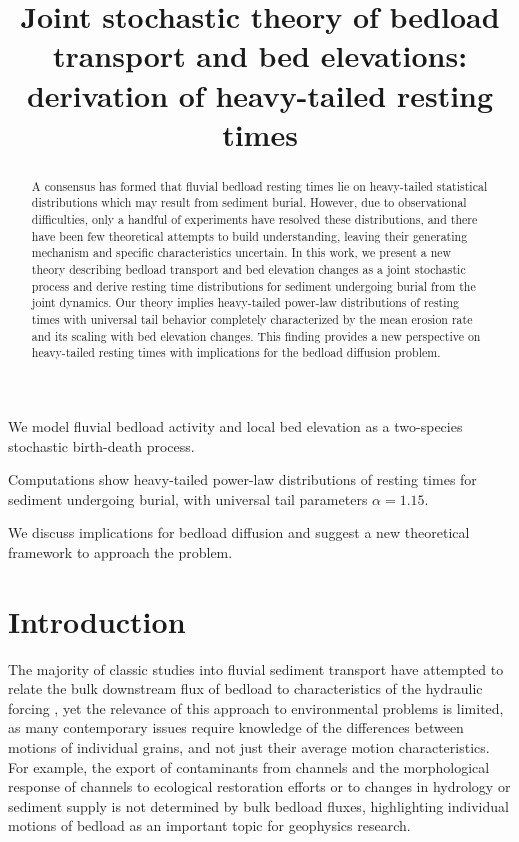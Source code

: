 \documentclass[draft]{agujournal2018}
\begin{document}
\title{Joint stochastic theory of bedload transport and bed elevations: derivation of heavy-tailed resting times}

\begin{keypoints}
\item We model fluvial bedload activity and local bed elevation as a two-species stochastic birth-death process.
\item Computations show heavy-tailed power-law distributions of resting times for sediment undergoing burial, with universal tail parameters $\alpha=1.15$.
\item We discuss implications for bedload diffusion and suggest a new theoretical framework to approach the problem.

\end{keypoints}

\begin{abstract}
A consensus has formed that fluvial bedload resting times lie on heavy-tailed statistical distributions which may result from sediment burial.
However, due to observational difficulties, only a handful of experiments have resolved these distributions, and there have been few theoretical attempts to build understanding, leaving their generating mechanism and specific characteristics uncertain.
In this work, we present a new theory describing bedload transport and bed elevation changes as a joint stochastic process and derive resting time distributions for sediment undergoing burial from the joint dynamics.
Our theory implies heavy-tailed power-law distributions of resting times with universal tail behavior completely characterized by the mean erosion rate and its scaling with bed elevation changes.
This finding provides a new perspective on heavy-tailed resting times with implications for the bedload diffusion problem.

\end{abstract} 

\section{Introduction}

The majority of classic studies into fluvial sediment transport have attempted to relate the bulk downstream flux of bedload to characteristics of the hydraulic forcing \citep[e.g.][]{Yalin1972}, yet the relevance of this approach to environmental problems is limited, as many contemporary issues require knowledge of the differences between motions of individual grains, and not just their average motion characteristics.
For example, the export of contaminants from channels \citep[e.g.][]{Malmon2005} and the morphological response of channels to ecological restoration efforts \citep[e.g.][]{Gaeuman2017} or to changes in hydrology or sediment supply \citep[e.g.][]{Hassan2017} is not determined by bulk bedload fluxes, highlighting individual motions of bedload as an important topic for geophysics research.
\end{document}
